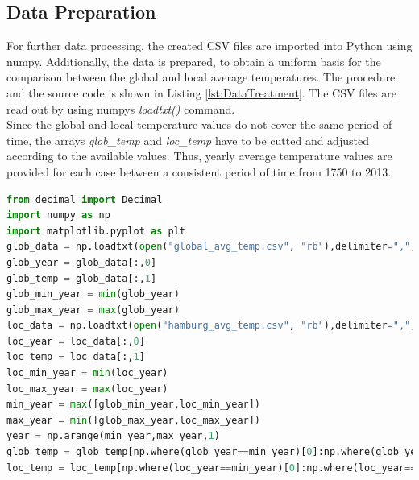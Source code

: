 \documentclass[a4paper]{article}
\begin{document}
\subsection{Data Preparation}
For further data processing, the created CSV files are imported into Python using numpy. Additionally, the data is prepared, to obtain a uniform basis for the comparison between the global and local average temperatures. The procedure and the source code is shown in Listing \ref{lst:DataTreatment}. The CSV files are read out by using numpys \emph{loadtxt()} command.\\
Since the global and local temperature values do not cover the same period of time, the arrays \emph{glob\_temp} and \emph{loc\_temp} have to be cutted and adjusted according to the available values. Thus, yearly average temperature values are provided for each case between a consistent period of time from 1750 to 2013.
\begin{lstlisting}[language=python,caption={Preparation of the imported data within Python},label=lst:DataTreatment]
from decimal import Decimal
import numpy as np
import matplotlib.pyplot as plt
glob_data = np.loadtxt(open("global_avg_temp.csv", "rb"),delimiter=",",skiprows=1)
glob_year = glob_data[:,0]
glob_temp = glob_data[:,1]
glob_min_year = min(glob_year)
glob_max_year = max(glob_year)
loc_data = np.loadtxt(open("hamburg_avg_temp.csv", "rb"),delimiter=",",skiprows=1)
loc_year = loc_data[:,0]
loc_temp = loc_data[:,1]
loc_min_year = min(loc_year)
loc_max_year = max(loc_year)
min_year = max([glob_min_year,loc_min_year])
max_year = min([glob_max_year,loc_max_year])
year = np.arange(min_year,max_year,1)
glob_temp = glob_temp[np.where(glob_year==min_year)[0]:np.where(glob_year==max_year)[0]]
loc_temp = loc_temp[np.where(loc_year==min_year)[0]:np.where(loc_year==max_year)[0]]
\end{lstlisting}
\end{document}
